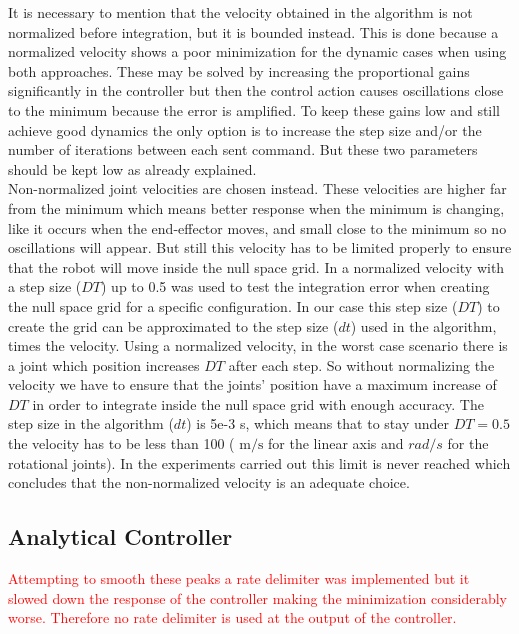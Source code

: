 It is necessary to mention that the velocity obtained in the algorithm is not normalized before  integration, but it is bounded instead. This is done because a normalized velocity shows a poor minimization for the dynamic cases when using both approaches. These may be solved by increasing the proportional gains significantly in the controller but then the control action causes oscillations close to the minimum because the error is  amplified. To keep these gains low and still achieve good dynamics the only option is to increase the step size and/or the number of iterations between each sent command. But these two parameters should be kept low as already explained. \\
Non-normalized joint velocities are chosen instead. These velocities are higher far from the minimum which means better response when the minimum is changing, like it occurs when the end-effector moves, and small close to the minimum so no oscillations will appear. But still this velocity has to be limited properly to ensure that the robot will move inside the null space grid.  In \cite{fabianthesis} a normalized velocity with a step size ($DT$) up to 0.5 was used to test the integration error when creating the null space grid for a specific configuration. 
In our case this step size ($DT$) to create the grid can be approximated to the step size ($dt$) used in the algorithm, times the velocity. Using a normalized velocity, in the worst case scenario there is a joint which position increases $DT$ after each step. So without normalizing the velocity we have to ensure that the joints' position have a maximum increase of $DT$ in order to integrate inside the null space grid with enough accuracy.
The step size in the algorithm ($dt$) is 5e-3 s, which means that to stay under $DT=0.5$ the velocity has to be less than 100 ( $\mathrm{m/s}$ for the linear axis and $rad/s$ for the rotational joints). In the experiments carried out this limit is never reached which concludes that the non-normalized velocity is an adequate choice. 


\subsection{Analytical Controller}

\textcolor{red}{Attempting to smooth these peaks a rate delimiter was implemented but it slowed down the response of the controller making the minimization considerably worse. Therefore no rate delimiter is used at the output of the controller.}

